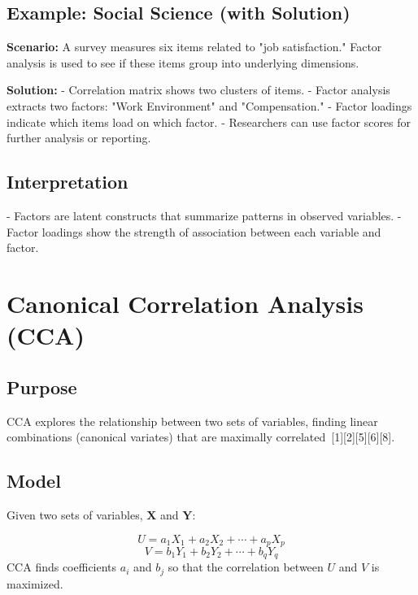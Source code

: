 \documentclass[11pt]{article}
\begin{document}
\subsection{Example: Social Science (with Solution)}

\textbf{Scenario:} A survey measures six items related to "job satisfaction." Factor analysis is used to see if these items group into underlying dimensions.

\textbf{Solution:}
- Correlation matrix shows two clusters of items.
- Factor analysis extracts two factors: "Work Environment" and "Compensation."
- Factor loadings indicate which items load on which factor.
- Researchers can use factor scores for further analysis or reporting.

\subsection{Interpretation}

- Factors are latent constructs that summarize patterns in observed variables.
- Factor loadings show the strength of association between each variable and factor.

\section{Canonical Correlation Analysis (CCA)}

\subsection{Purpose}

CCA explores the relationship between two sets of variables, finding linear combinations (canonical variates) that are maximally correlated\ [1][2][5][6][8].

\subsection{Model}

Given two sets of variables, $\mathbf{X}$ and $\mathbf{Y}$:

\[
U = a_1 X_1 + a_2 X_2 + \cdots + a_p X_p
\]
\[
V = b_1 Y_1 + b_2 Y_2 + \cdots + b_q Y_q
\]
CCA finds coefficients $a_i$ and $b_j$ so that the correlation between $U$ and $V$ is maximized.
\end{document}
